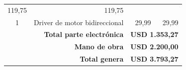 \begin{table}[t]
\begin{tabular}{c l c c}
\multicolumn{1}{r}{119,75}                         & 
\multicolumn{1}{r}{119,75}             \\ 
\multicolumn{1}{c}{1}                             & 
\multicolumn{1}{l}{Driver de motor bidireccional}  & 
\multicolumn{1}{r}{29,99}                          & 
\multicolumn{1}{r}{29,99}              \\ 
\hline 
\multicolumn{2}{r}{\textbf{Total parte electrónica }}  & 
\multicolumn{2}{r}{\textbf{USD 1.353,27}}   \\ 
\multicolumn{2}{r}{\textbf{Mano de obra}}         & 
\multicolumn{2}{r}{\textbf{ USD 2.200,00}}      \\ 
\multicolumn{2}{r}{\textbf{Total genera}}        & 
\multicolumn{2}{r}{\textbf{USD 3.793,27}}  \\ 
\hline
\end{tabular}
\end{table}